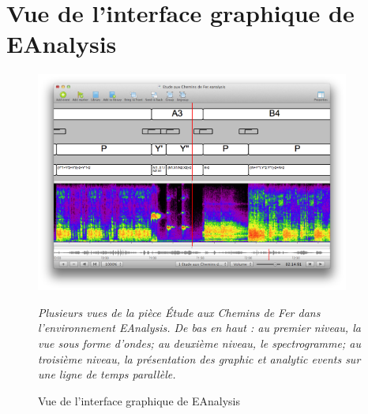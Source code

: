 \section{Vue de l'interface graphique de EAnalysis}
\label{sec:exempleVueEAnalysis}
\begin{figure}[H]
	\centering
	\includegraphics[keepaspectratio=true, width=0.92\textwidth]{Annexes/i/exempleVueEAnalysis.png}
	\caption{Vue de l'interface graphique de EAnalysis}
	\medskip
	\small
	\it
	Plusieurs vues de la pièce \textit{Étude aux Chemins de Fer} dans l'environnement \textit{EAnalysis}.
	De bas en haut : au premier niveau, la vue sous forme d'ondes; au deuxième niveau, le spectrogramme; au troisième niveau, la présentation des graphic et analytic events sur une ligne de temps parallèle.  	
	\label{fig:exempleVueEAnalysis}
\end{figure}